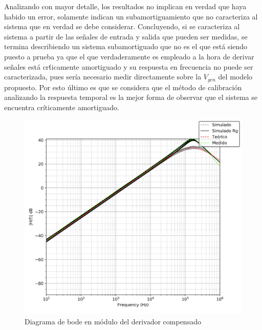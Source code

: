 Analizando con mayor detalle, los resultados no implican en verdad que haya habido un error, solamente indican
un subamortiguamiento que no caracteriza al sistema que en verdad se debe considerar. Concluyendo, si se caracteriza al sistema a partir de las se\~nales de entrada
y salida que pueden ser medidas, se termina describiendo un sistema subamortiguado que no es el que est\'a siendo puesto a prueba ya que el que verdaderamente es empleado a la hora de derivar se\~nales est\'a cr\'ticamente
amortiguado y su respuesta en frecuencia no puede ser caracterizada, pues ser\'ia necesario medir directamente sobre la $V_{gen}$ del modelo propuesto. Por esto \'ultimo es que se considera que el
m\'etodo de calibraci\'on analizando la respuesta temporal es la mejor forma de observar que el sistema se encuentra cr\'iticamente amortiguado.

\begin{figure}[H]
	\centering
	\includegraphics[scale=0.6]{Recursos/Derivador_compensado/bode_modulo.png}
	\caption{Diagrama de bode en m\'odulo del derivador compensado}
	\label{fig:derivador_compensado_bode_modulo}
\end{figure}

